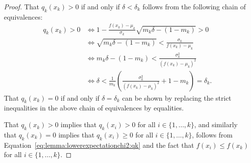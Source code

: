 \documentclass{article}
\begin{document}
\begin{proof}
That $q_k(x_k)>0$ if and only if $\delta<\delta_k$ follows from the following chain of equivalences:
\begin{align*}
q_k(x_k)>0
&\Leftrightarrow
1-\frac{f(x_k)-\mu_k}{\sigma_k}\sqrt{m_k\delta-(1-m_k)}>0\\
&\Leftrightarrow
\sqrt{m_k\delta-(1-m_k)}<\frac{\sigma_k}{f(x_k)-\mu_k}\\
&\Leftrightarrow
m_k\delta-(1-m_k)<\frac{\sigma_k^2}{(f(x_k)-\mu_k)^2}\\
&\Leftrightarrow
\delta<\frac{1}{m_k}\left(\frac{\sigma_k^2}{(f(x_k)-\mu_k)^2}+1-m_k\right)=\delta_k.
\end{align*}
That $q_k(x_k)=0$ if and only if $\delta=\delta_k$ can be shown by replacing the strict inequalities in the above chain of equivalences by equalities.

That $q_k(x_k)>0$ implies that $q_k(x_i)>0$ for all $i\in\{1,\ldots,k\}$, and similarly that $q_k(x_k)=0$ implies that $q_k(x_i)\geq0$ for all $i\in\{1,\ldots,k\}$, follows from Equation~\eqref{eq:lemma:lowerexpectationchi2:qk} and the fact that $f(x_i)\leq f(x_k)$ for all $i\in\{1,\ldots,k\}$. 


\end{proof}
\end{document}
